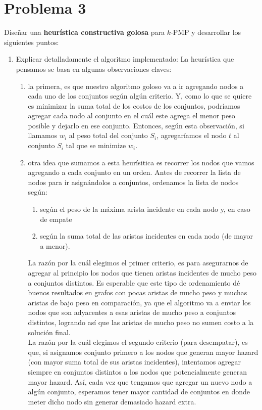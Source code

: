 \documentclass[11pt, a4paper, twoside]{article}
\begin{document}
			
\newpage
\section{Problema 3}
    
	Diseñar una \textbf{heurística constructiva golosa} para $k$-PMP y desarrollar los siguientes puntos:
    
    \begin{enumerate}
		\item Explicar detalladamente el algoritmo implementado:
		La heurística que pensamos se basa en algunas observaciones claves: 
		\begin{enumerate}
			\item la primera, es que nuestro
			algoritmo goloso va a ir agregando nodos a cada uno de los conjuntos según algún criterio. Y,
			como lo que se quiere es minimizar la suma total de los costos de los conjuntos, podríamos agregar
			cada nodo al conjunto en el cuál este agrega el menor peso posible y dejarlo en ese conjunto. 
			Entonces, según esta observación,
			si llamamos $w_{i}$ al peso total del conjunto $S_{i}$, 
			agregaríamos el nodo $t$ al conjunto $S_{i}$ tal que se minimize $w_{i}$.
						
			\item otra idea que sumamos a esta heurísitica es recorrer los nodos que vamos agregando a
			cada conjunto en un orden. Antes de recorrer la lista de nodos para ir asignándolos a conjuntos,
			ordenamos la lista de nodos según: 
			\begin{enumerate}
				\item según el peso de la máxima arista incidente en cada nodo y, en caso de empate
				\item según la suma total de las aristas incidentes en cada nodo (de mayor a menor).
			\end{enumerate}
			La razón por la cuál elegimos el primer criterio, es para asegurarnos de agregar al principio los nodos
			que tienen aristas incidentes de mucho peso a conjuntos distintos.
			Es esperable que este tipo de ordenamiento dé buenos resultados en grafos con pocas aristas de mucho
			peso y muchas aristas de bajo peso en comparación, ya que el algoritmo va a enviar los nodos 
			que son adyacentes a esas aristas de mucho peso a conjuntos distintos, logrando así que las aristas de
			mucho peso no sumen costo a la solución final. \\
			La razón por la cuál elegimos el segundo criterio (para desempatar), es que, si asignamos conjunto
			primero a los nodos que generan mayor hazard (con mayor suma total de sus aristas incidentes), intentamos
			agregar siempre en conjuntos distintos a los nodos que potencialmente generan mayor hazard. Así, cada vez que 
			tengamos que agregar un nuevo nodo a algún conjunto, esperamos tener mayor cantidad de conjuntos en donde 
			meter dicho nodo sin generar demasiado hazard extra. \\
			

\end{enumerate}
\end{enumerate}
\end{document}

